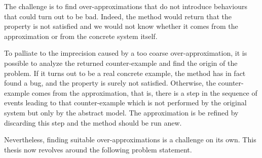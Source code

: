 %
The challenge is to find over-approximations that do not introduce
behaviours that could turn out to be bad. Indeed, the method would
return that the property is not satisfied and we would not know
whether it comes from the approximation or from the concrete system
itself. %
                                   



To palliate to the imprecision caused by a too coarse
over-approximation, it is possible to analyze the returned
counter-example and find the origin of the problem. If it turns out to
be a real concrete example, the method has in fact found a bug, and
the property is surely not satisfied. Otherwise, the counter-example
comes from the approximation, that is, there is a step in the sequence
of events leading to that counter-example which is not performed by
the original system but only by the abstract model. The approximation
is be refined by discarding this step and the method should be run
anew.

Nevertheless, finding suitable over-approximations is a challenge on
its own. %
This thesis now revolves around the following problem statement.
%
%
